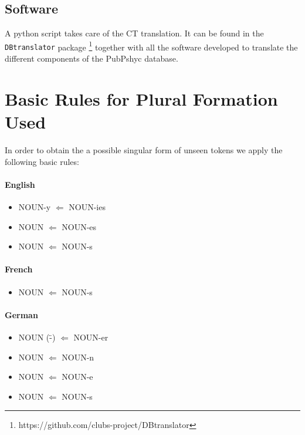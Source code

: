 \documentclass[a4paper,11pt]{article}
\begin{document}
\subsection{Software}

A python script takes care of the CT translation. It can be found in the {\tt DBtranslator} package%
\footnote{\url{}https://github.com/clubs-project/DBtranslator}
together with all the software developed to translate the different components of the PubPshyc database.





%
%
\appendix
\section{Basic Rules for Plural Formation Used}
\label{ap:plural}

In order to obtain the a possible singular form of unseen tokens we apply the following basic rules:

\renewcommand{\labelitemi}{$\star$}
\paragraph{English}
\begin{itemize}
\itemsep-0.2em 
 \item NOUN-y $\Leftarrow$ NOUN-ies
 \item NOUN $\Leftarrow$ NOUN-es
 \item NOUN $\Leftarrow$ NOUN-s
\end{itemize}

\paragraph{French}
\begin{itemize}
\itemsep-0.2em 
 \item NOUN $\Leftarrow$ NOUN-s
\end{itemize}

\paragraph{German}
\begin{itemize}
\itemsep-0.2em 
 \item NOUN (\"-) $\Leftarrow$ NOUN-er
 \item NOUN $\Leftarrow$ NOUN-n
 \item NOUN $\Leftarrow$ NOUN-e
 \item NOUN $\Leftarrow$ NOUN-s
\end{itemize}
\end{document}
